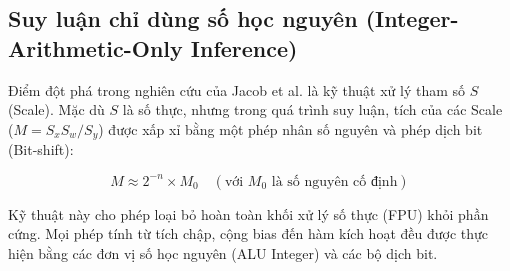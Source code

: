 \subsection{Suy luận chỉ dùng số học nguyên (Integer-Arithmetic-Only Inference)}
Điểm đột phá trong nghiên cứu của Jacob et al. là kỹ thuật xử lý tham số $S$ (Scale). Mặc dù $S$ là số thực, nhưng trong quá trình suy luận, tích của các Scale ($M = S_x S_w / S_y$) được xấp xỉ bằng một phép nhân số nguyên và phép dịch bit (Bit-shift):

\begin{equation}
    M \approx 2^{-n} \times M_0 \quad (\text{với } M_0 \text{ là số nguyên cố định})
\end{equation}

Kỹ thuật này cho phép loại bỏ hoàn toàn khối xử lý số thực (FPU) khỏi phần cứng. 
Mọi phép tính từ tích chập, cộng bias đến hàm kích hoạt đều được thực hiện bằng 
các đơn vị số học nguyên (ALU Integer) và các bộ dịch bit.

